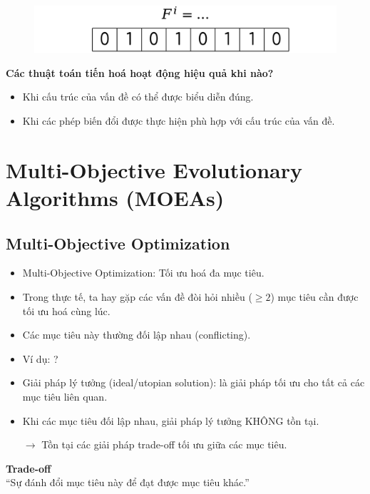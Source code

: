 \documentclass{book}
\begin{document}
            \begin{figure}[H]
                \centering
                \includegraphics[width=0.7\linewidth]{images/ge_ex5.png}
                \label{fig:ge_ex5}
            \end{figure}
            
            \textbf{Các thuật toán tiến hoá hoạt động hiệu quả khi nào?}
            \begin{itemize}
                \item Khi cấu trúc của vấn đề có thể được biểu diễn đúng.
                \item Khi các phép biến đổi được thực hiện phù hợp với cấu trúc của vấn đề.
            \end{itemize}
\chapter{Multi-Objective Evolutionary Algorithms (MOEAs)}
\section{Multi-Objective Optimization}

\begin{itemize}
    \item Multi-Objective Optimization: Tối ưu hoá đa mục tiêu.
    \item Trong thực tế, ta hay gặp các vấn đề đòi hỏi nhiều ($\ge 2$) mục tiêu cần được tối ưu hoá cùng lúc.
    \item Các mục tiêu này thường đối lập nhau (conflicting).
    \item Ví dụ: ?
\end{itemize}

\begin{itemize}
    \item Giải pháp lý tưởng (ideal/utopian solution): là giải pháp tối ưu cho tất cả các mục tiêu liên quan.
    \item Khi các mục tiêu đối lập nhau, giải pháp lý tưởng KHÔNG tồn tại.
    \item[$\rightarrow$] Tồn tại các giải pháp trade-off tối ưu giữa các mục tiêu.
\end{itemize}

\begin{flushright}
    \textbf{Trade-off} \\
    ``Sự đánh đổi mục tiêu này để đạt được mục tiêu khác.'' 
\end{flushright}
\end{document}
